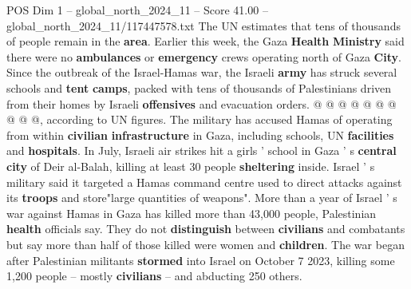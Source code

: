\begin{textsample}{POS Dim 1 – global\_north\_2024\_11 – Score 41.00 – global\_north\_2024\_11/117447578.txt}
The UN estimates that tens of thousands of people remain in the \textbf{area}.
Earlier this week, the Gaza \textbf{Health} \textbf{Ministry} said there were no \textbf{ambulances} or \textbf{emergency} crews operating north of Gaza \textbf{City}.
Since the outbreak of the Israel-Hamas war, the Israeli \textbf{army} has struck several schools and \textbf{tent} \textbf{camps}, packed with tens of thousands of Palestinians driven from their homes by Israeli \textbf{offensives} and evacuation orders. @ @ @ @ @ @ @ @ @ @, according to UN figures.
The military has accused Hamas of operating from within \textbf{civilian} \textbf{infrastructure} in Gaza, including schools, UN \textbf{facilities} and \textbf{hospitals}.
In July, Israeli air strikes hit a girls ' school in Gaza ' s \textbf{central} \textbf{city} of Deir al-Balah, killing at least 30 people \textbf{sheltering} inside.
Israel ' s military said it targeted a Hamas command centre used to direct attacks against its \textbf{troops} and store"large quantities of weapons".
More than a year of Israel ' s war against Hamas in Gaza has killed more than 43,000 people, Palestinian \textbf{health} officials say.
They do not \textbf{distinguish} between \textbf{civilians} and combatants but say more than half of those killed were women and \textbf{children}.
The war began after Palestinian militants \textbf{stormed} into Israel on October 7 2023, killing some 1,200 people -- mostly \textbf{civilians} -- and abducting 250 others.

\end{textsample}
